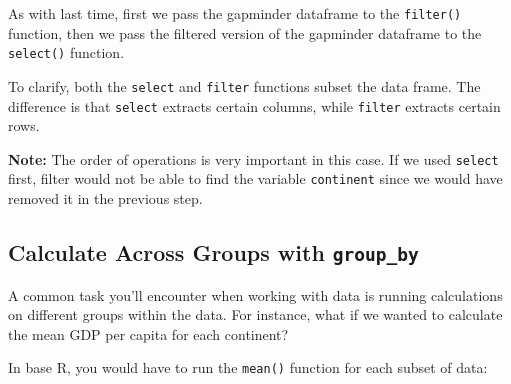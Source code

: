 \documentclass[]{book}
\newenvironment{Shaded}{\begin{snugshade}}{\end{snugshade}}
\newcommand{\KeywordTok}[1]{\textcolor[rgb]{0.13,0.29,0.53}{\textbf{#1}}}
\newcommand{\StringTok}[1]{\textcolor[rgb]{0.31,0.60,0.02}{#1}}
\newcommand{\CommentTok}[1]{\textcolor[rgb]{0.56,0.35,0.01}{\textit{#1}}}
\newcommand{\OperatorTok}[1]{\textcolor[rgb]{0.81,0.36,0.00}{\textbf{#1}}}
\newcommand{\NormalTok}[1]{#1}
\begin{document}
As with last time, first we pass the gapminder dataframe to the
\texttt{filter()} function, then we pass the filtered version of the
gapminder dataframe to the \texttt{select()} function.

To clarify, both the \texttt{select} and \texttt{filter} functions
subset the data frame. The difference is that \texttt{select} extracts
certain columns, while \texttt{filter} extracts certain rows.

\textbf{Note:} The order of operations is very important in this case.
If we used \texttt{select} first, filter would not be able to find the
variable \texttt{continent} since we would have removed it in the
previous step.

\subsection{\texorpdfstring{Calculate Across Groups with
\texttt{group\_by}}{Calculate Across Groups with group\_by}}\label{calculate-across-groups-with-group_by}

A common task you'll encounter when working with data is running
calculations on different groups within the data. For instance, what if
we wanted to calculate the mean GDP per capita for each continent?

In base R, you would have to run the \texttt{mean()} function for each
subset of data:

\begin{Shaded}
\end{Shaded}
\end{document}
